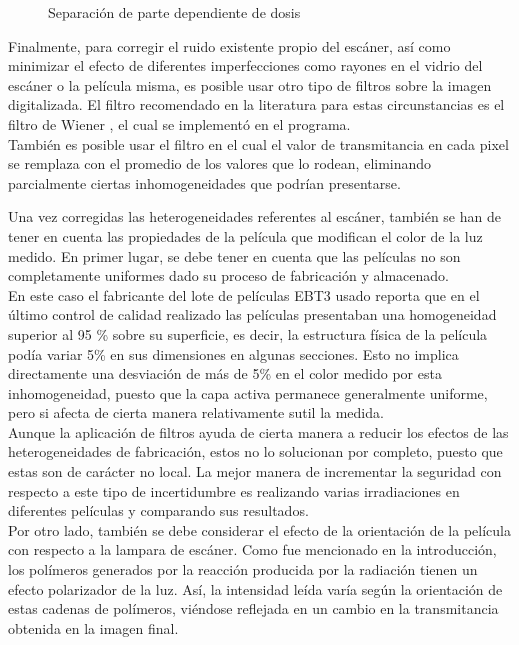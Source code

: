 \begin{figure}
	\centering
	
	\caption{Separación de parte dependiente de dosis}
	\label{fig:Multicanal}
\end{figure}

Finalmente, para corregir el ruido existente propio del escáner, así como minimizar el efecto de diferentes imperfecciones como rayones en el vidrio del escáner o la película misma, es posible usar otro tipo de filtros sobre la imagen digitalizada. El filtro recomendado en la literatura para estas circunstancias es el filtro de Wiener \cite{Devic2016}, el cual se implementó en el programa. \\

También es posible usar el filtro en el cual el valor de transmitancia en cada pixel se remplaza con el promedio de los valores que lo rodean, eliminando parcialmente ciertas inhomogeneidades que podrían presentarse.

Una vez corregidas las heterogeneidades referentes al escáner, también se han de tener en cuenta las propiedades de la película que modifican el color de la luz medido. En primer lugar, se debe tener en cuenta que las películas no son completamente uniformes dado su proceso de fabricación y almacenado.\\

En este caso el fabricante del lote de películas EBT3 usado reporta que en el último control de calidad realizado las películas presentaban una homogeneidad superior al 95 \% sobre su superficie, es decir, la estructura física de la película podía variar 5\% en sus dimensiones en algunas secciones. Esto no implica directamente una desviación de más de 5\% en el color medido por esta inhomogeneidad, puesto que la capa activa permanece generalmente uniforme, pero si afecta de cierta manera relativamente sutil la medida. \\ 

Aunque la aplicación de filtros ayuda de cierta manera a reducir los efectos de las heterogeneidades de fabricación, estos no lo solucionan por completo, puesto que estas son de carácter no local. La mejor manera de incrementar la seguridad con respecto a este tipo de incertidumbre es realizando varias irradiaciones en  diferentes películas y comparando sus resultados.\\

Por otro lado, también se debe considerar el efecto de la orientación de la película con respecto a la lampara de escáner. Como fue mencionado en la introducción, los polímeros generados por la reacción producida por la radiación tienen un efecto polarizador de la luz. Así, la intensidad leída varía según la orientación de estas cadenas de polímeros, viéndose reflejada en un cambio en la transmitancia obtenida en la imagen final.\\








